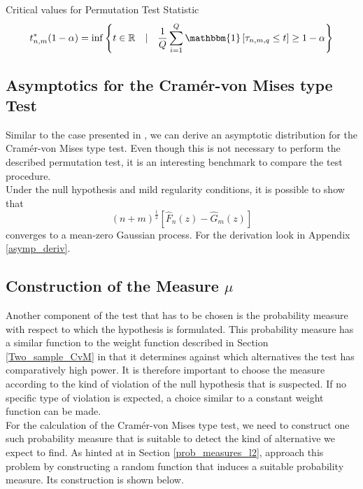 \documentclass[12pt, a4paper]{article}
\theoremstyle{MAstyle} \newtheorem{assumption}{Assumption}[section]
\theoremstyle{MAstyle} \newtheorem{definition}{Definition}[section]
\theoremstyle{MAstyle} \newtheorem{theorem}{Theorem}[section]
\begin{document}
			Critical values for Permutation Test Statistic
			\begin{equation}
				t^{*}_{n,m}(1-\alpha) = \inf \left\{t \in \mathbb{R} \quad \vert \quad \frac{1}{Q} \sum_{i = 1}^{Q} \mathbbm{1}\left[\tau_{n,m,q} \leq t\right] \geq 1 - \alpha \right\}
			\end{equation}
		
		\subsection{Asymptotics for the Cram\'{e}r-von Mises type Test}
			Similar to the case presented in \cite{bugni_goodness--fit_2009}, we can derive an asymptotic distribution for the Cram\'{e}r-von Mises type test. Even though this is not necessary to perform the described permutation test, it is an interesting benchmark to compare the test procedure. \\
			
			Under the null hypothesis and mild regularity conditions, it is possible to show that 
			\begin{equation}
				(n+m)^{\frac{1}{2}} \left[\hat{F}_n(z) - \hat{G}_m(z)\right]
			\end{equation}
			converges to a mean-zero Gaussian process. For the derivation look in Appendix \ref{asymp_deriv}.
		
		\subsection{Construction of the Measure $\mu$}\label{mu}
			Another component of the test that has to be chosen is the probability measure with respect to which the hypothesis is formulated. This probability measure has a similar function to the weight function described in Section \ref{Two_sample_CvM} in that it determines against which alternatives the test has comparatively high power. It is therefore important to choose the measure according to the kind of violation of the null hypothesis that is suspected. If no specific type of violation is expected, a choice similar to a constant weight function can be made.\\
			
			For the calculation of the Cram\'{e}r-von Mises type test, we need to construct one such probability measure that is suitable to detect the kind of alternative we expect to find.
			As hinted at in Section \ref{prob_measures_l2}, \cite{bugni_permutation_2021} approach this problem by constructing a random function that induces a suitable probability measure. Its construction is shown below.
			
\end{document}
